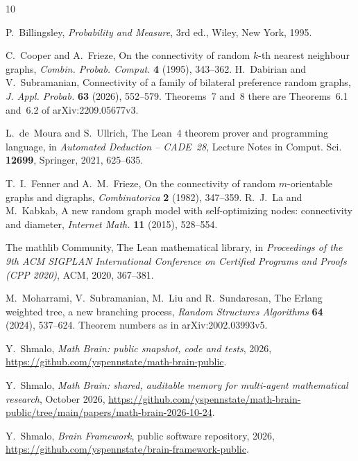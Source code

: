 \documentclass[11pt]{amsart}
\theoremstyle{remark}
\numberwithin{equation}{section}
\newcommand{\1}{\mathbf 1}
\begin{document}
\begin{thebibliography}{10}

P.~Billingsley, \emph{Probability and Measure}, 3rd ed., Wiley, New York, 1995.

C.~Cooper and A.~Frieze, On the connectivity of random $k$-th nearest neighbour graphs, \emph{Combin. Probab. Comput.} \textbf{4} (1995), 343--362.
H.~Dabirian and V.~Subramanian, Connectivity of a family of bilateral preference random graphs, \emph{J. Appl. Probab.} \textbf{63} (2026), 552--579. Theorems~7 and~8 there are Theorems~6.1 and~6.2 of arXiv:2209.05677v3.

L.~de~Moura and S.~Ullrich, The Lean~4 theorem prover and programming language, in \emph{Automated Deduction -- CADE~28}, Lecture Notes in Comput. Sci. \textbf{12699}, Springer, 2021, 625--635.

T.~I.~Fenner and A.~M.~Frieze, On the connectivity of random $m$-orientable graphs and digraphs, \emph{Combinatorica} \textbf{2} (1982), 347--359.
R.~J.~La and M.~Kabkab, A new random graph model with self-optimizing nodes: connectivity and diameter, \emph{Internet Math.} \textbf{11} (2015), 528--554.

The mathlib Community, The Lean mathematical library, in \emph{Proceedings of the 9th ACM SIGPLAN International Conference on Certified Programs and Proofs (CPP 2020)}, ACM, 2020, 367--381.

M.~Moharrami, V.~Subramanian, M.~Liu and R.~Sundaresan, The Erlang weighted tree, a new branching process, \emph{Random Structures Algorithms} \textbf{64} (2024), 537--624. Theorem numbers as in arXiv:2002.03993v5.

 Y.~Shmalo, \emph{Math Brain: public snapshot, code and tests}, 2026, \url{https://github.com/yspennstate/math-brain-public}.

 Y.~Shmalo, \emph{Math Brain: shared, auditable memory for multi-agent mathematical research}, October 2026, \url{https://github.com/yspennstate/math-brain-public/tree/main/papers/math-brain-2026-10-24}.

 Y.~Shmalo, \emph{Brain Framework}, public software repository, 2026, \url{https://github.com/yspennstate/brain-framework-public}.

\end{thebibliography}
\end{document}
